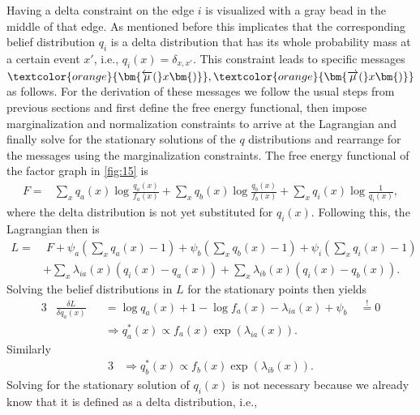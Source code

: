 Having a delta constraint on the edge \(i\) is visualized with a gray bead in the middle of that edge. As mentioned before this implicates that the corresponding belief distribution \(q_i\) is a delta distribution that has its whole probability mass at a certain event \(x'\), i.e., \(q_i(x) = \delta_{x,x'}\). This constraint leads to specific messages \(\textcolor{orange}{\bm{\overleftarrow{\mu}(}x\bm{)}}, \textcolor{orange}{\bm{\overrightarrow{\mu}(}x\bm{)}}\) as follows. For the derivation of these messages we follow the usual steps from previous sections and first define the free energy functional, then impose marginalization and normalization constraints to arrive at the Lagrangian and finally solve for the stationary solutions of the \(q\) distributions and rearrange for the messages using the marginalization constraints.
The free energy functional of the factor graph in \cref{fig:15} is
\begin{equation}
    \begin{split}
        F = & \sum_x q_a(x) \log \frac{q_a(x)}{f_a(x)} + \sum_{x} q_b(x) \log \frac{q_b(x)}{f_b(x)} + \sum_x q_i(x) \log \frac{1}{q_i(x)},
    \end{split}
\end{equation}
where the delta distribution is not yet substituted for \(q_i(x)\). Following this, the Lagrangian then is
\begin{equation}
    \begin{split}
        L = & \; F + \psi_a (\sum_x q_a(x) - 1) + \psi_b (\sum_{x} q_b(x) - 1) + \psi_i (\sum_x q_i(x) - 1) \\
            & + \sum_x \lambda_{ia}(x) (q_i(x) - q_a(x)) + \sum_x \lambda_{ib}(x) (q_i(x) - q_b(x)).
    \end{split}
\end{equation}
Solving the belief distributions in \(L\) for the stationary points then yields
\begin{alignat}{3}
     & \frac{\delta L}{\delta q_a(x)} &  & = \log q_a(x) + 1 - \log f_a(x) - \lambda_{ia}(x) + \psi_b & \; \overset{!}{=} 0 \\
     &                                &  & \Rightarrow q_a^*(x) \propto f_a(x) \exp(\lambda_{ia}(x)).
\end{alignat}
Similarly
\begin{alignat}{3}
     & \Rightarrow q_b^*(x) \propto f_b(x) \exp(\lambda_{ib}(x)).
\end{alignat}
Solving for the stationary solution of \(q_i(x)\) is not necessary because we already know that it is defined as a delta distribution, i.e.,

